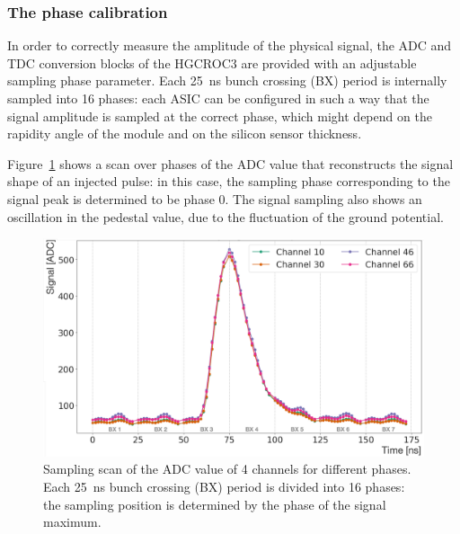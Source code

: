 
\subsubsection{The phase calibration}
\label{subsubsec:The phase calibration}

In order to correctly measure the amplitude of the physical signal, the ADC and TDC conversion blocks of the HGCROC3 are provided with an adjustable sampling phase parameter.
Each 25~ns bunch crossing (BX) period is internally sampled into 16 phases: each ASIC can be configured in such a way that the signal amplitude is sampled at the correct phase, which might depend on the rapidity angle of the module and on the silicon sensor thickness.

Figure~\ref{fig:BestPhase} shows a scan over phases of the ADC value that reconstructs the signal shape of an injected pulse: in this case, the sampling phase corresponding to the signal peak is determined to be phase 0.
The signal sampling also shows an oscillation in the pedestal value, due to the fluctuation of the ground potential.

\begin{figure}[b!]
    \centering
    \includegraphics[width=0.65\linewidth]{Figures/HGCAL/BestPhase.pdf}
    \caption{Sampling scan of the ADC value of 4 channels for different phases. Each 25~ns bunch crossing (BX) period is divided into 16 phases: the sampling position is determined by the phase of the signal maximum.}
    \label{fig:BestPhase}
\end{figure}

